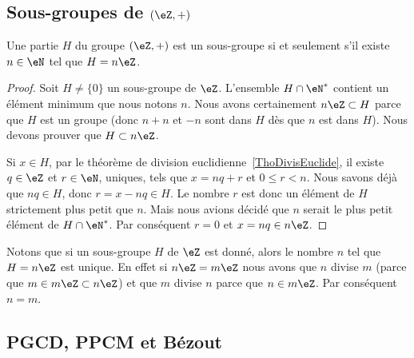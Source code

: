 
\subsection{Sous-groupes de \( (\eZ,+)\) }

\begin{proposition} \label{PropSsgpZestnZ}
    Une partie \( H\) du groupe \( (\eZ,+)\) est un sous-groupe si et seulement s'il existe \( n\in\eN\) tel que \( H=n\eZ\).
\end{proposition}

\begin{proof}
    Soit \( H\neq\{ 0 \}\) un sous-groupe de \( \eZ\). L'ensemble \( H\cap\eN^*\) contient un élément minimum que nous notons \( n\). Nous avons certainement \( n\eZ\subset H\) parce que \( H\) est un groupe (donc \( n+n\) et \( -n\) sont dans \( H\) dès que \( n\) est dans \( H\)). Nous devons prouver que \( H\subset n\eZ\).

    Si \( x\in H\), par le théorème de division euclidienne~\ref{ThoDivisEuclide}, il existe \( q\in\eZ\) et \( r\in\eN \), uniques, tels que \( x=nq+r\) et \(0 \leq r < n \). Nous savons déjà que \( nq\in H\), donc \( r = x - nq \in H \). Le nombre \( r\) est donc un élément de \( H\) strictement plus petit que \( n\). Mais nous avions décidé que \( n\) serait le plus petit élément de \( H\cap\eN^*\). Par conséquent \( r=0\) et \( x=nq\in n\eZ\).
\end{proof}


Notons que si un sous-groupe \( H\) de \( \eZ\) est donné, alors le nombre \( n\) tel que \( H=n\eZ\) est unique. En effet si \( n\eZ=m\eZ\) nous avons que \( n\) divise \( m\) (parce que \( m\in m\eZ\subset n\eZ\)) et que \( m\) divise \( n\) parce que \( n\in m\eZ\). Par conséquent \( n=m\).


\subsection{PGCD, PPCM et Bézout}

